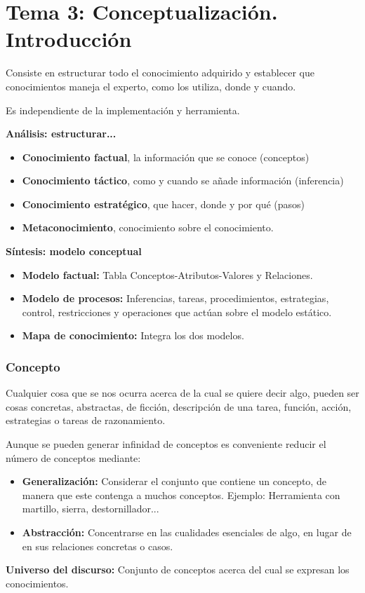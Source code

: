 \documentclass[12pt, twoside, openright]{report} %
\begin{document}
\chapter{Tema 3: Conceptualización. Introducción}
Consiste en estructurar todo el conocimiento adquirido y establecer que conocimientos maneja el experto, como los utiliza, donde y cuando. 

Es independiente de la implementación y herramienta.

\textbf{Análisis: estructurar...}
\begin{itemize}
	\item \textbf{Conocimiento factual}, la información que se conoce (conceptos)
	\item \textbf{Conocimiento táctico}, como y cuando se añade información (inferencia)
	\item \textbf{Conocimiento estratégico}, que hacer, donde y por qué (pasos)
	\item \textbf{Metaconocimiento}, conocimiento sobre el conocimiento.
\end{itemize}
\textbf{Síntesis: modelo conceptual}
\begin{itemize}
	\item \textbf{Modelo factual:} Tabla Conceptos-Atributos-Valores y Relaciones.
	\item \textbf{Modelo de procesos:} Inferencias, tareas, procedimientos, estrategias, control, restricciones y operaciones que actúan sobre el modelo estático.
	\item \textbf{Mapa de conocimiento:} Integra los dos modelos.
\end{itemize}

\subsection{Concepto}
Cualquier cosa que se nos ocurra acerca de la cual se quiere decir algo, pueden ser cosas concretas, abstractas, de ficción, descripción de una tarea, función, acción, estrategias o tareas de razonamiento.

Aunque se pueden generar infinidad de conceptos es conveniente reducir el número de conceptos mediante:
\begin{itemize}
	\item \textbf{Generalización:} Considerar el conjunto que contiene un concepto, de manera que este contenga a muchos conceptos. Ejemplo: Herramienta con martillo, sierra, destornillador...
	\item \textbf{Abstracción:} Concentrarse en las cualidades esenciales de algo, en lugar de en sus relaciones concretas o casos.
\end{itemize}
\textbf{Universo del discurso:} Conjunto de conceptos acerca del cual se expresan los conocimientos.
\end{document}
